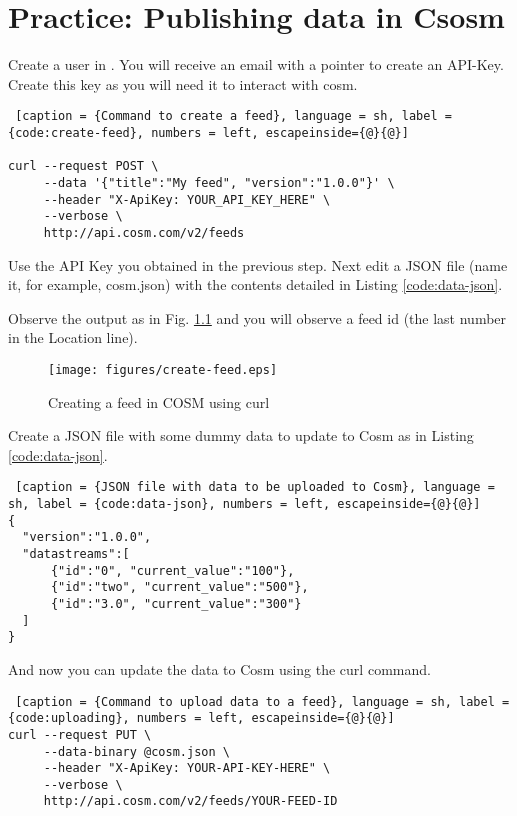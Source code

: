 \chapter{Practice: Publishing data in Csosm}

Create a user in \emph{} .
You will receive an email with a pointer to create an API-Key.
Create this key as you will need it to interact with cosm.

\begin{lstlisting} [caption = {Command to create a feed}, language = sh, label = {code:create-feed}, numbers = left, escapeinside={@}{@}]

curl --request POST \
     --data '{"title":"My feed", "version":"1.0.0"}' \
     --header "X-ApiKey: YOUR_API_KEY_HERE" \
     --verbose \
     http://api.cosm.com/v2/feeds

\end{lstlisting}

Use the API Key you obtained in the previous step.
Next edit a JSON file (name it, for example, cosm.json) with the contents detailed in Listing \ref{code:data-json}.

Observe the output as in Fig. \ref{fig:create-feed} and you will observe a feed id (the last number in the Location line).

\begin{figure}[htbp]
  \centering
  \texttt{[image: figures/create-feed.eps]}
  \caption{Creating a feed in COSM using curl}
  \label{fig:create-feed}
\end{figure}

Create a JSON file with some dummy data to update to Cosm as in Listing \ref{code:data-json}.

\begin{lstlisting} [caption = {JSON file with data to be uploaded to Cosm}, language = sh, label = {code:data-json}, numbers = left, escapeinside={@}{@}]
{
  "version":"1.0.0",
  "datastreams":[
      {"id":"0", "current_value":"100"},
      {"id":"two", "current_value":"500"},
      {"id":"3.0", "current_value":"300"}
  ]
}
\end{lstlisting}

And now you can update the data to Cosm using the curl command.

\begin{lstlisting} [caption = {Command to upload data to a feed}, language = sh, label = {code:uploading}, numbers = left, escapeinside={@}{@}]
curl --request PUT \
     --data-binary @cosm.json \
     --header "X-ApiKey: YOUR-API-KEY-HERE" \
     --verbose \
     http://api.cosm.com/v2/feeds/YOUR-FEED-ID
\end{lstlisting}

